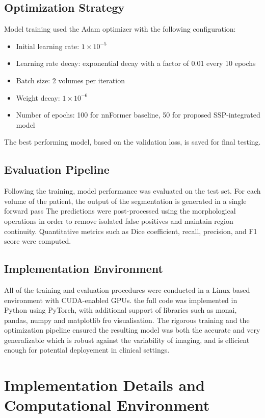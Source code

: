 \subsection{Optimization Strategy}
Model training used the Adam optimizer \cite{Kingma2015Adam} with the following configuration:

\begin{itemize} \item Initial learning rate: $1 \times 10^{-5}$ \item Learning rate decay: exponential decay with a factor of 0.01 every 10 epochs \item Batch size: 2 volumes per iteration \item Weight decay: $1 \times 10^{-6}$ \item Number of epochs: 100 for nnFormer baseline, 50 for proposed SSP-integrated model \end{itemize}

The best performing model, based on the validation loss, is saved for final testing.

\subsection{Evaluation Pipeline}
Following the training, model performance was evaluated on the test set. For each volume of the patient, the output of the segmentation is generated in a single forward pass The predictions were post-processed using the morphological operations in order to remove isolated false positives and maintain region continuity. Quantitative metrics such as Dice coefficient, recall, precision, and F1 score were computed.

\subsection{Implementation Environment}
All of the training and evaluation procedures were conducted in a Linux based environment with CUDA-enabled GPUs. the full code was implemented in Python using PyTorch, with additional support of libraries such as monai, pandas, numpy and matplotlib fro visualisation. The rigorous training and the optimization pipeline ensured the resulting model was both the accurate and very generalizable which is robust against the variability of imaging, and is efficient enough for potential deployement in clinical settings.

\section{Implementation Details and Computational Environment}

